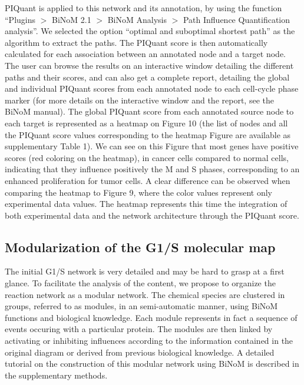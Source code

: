 \documentclass[10pt]{bmc_article}
\newenvironment{bmcformat}{\baselineskip20pt\sloppy\setboolean{publ}{false}}{\baselineskip20pt\sloppy}
\begin{document}
\begin{bmcformat}
PIQuant is applied to this network and its annotation, by using the function
``Plugins $>$ BiNoM 2.1 $>$ BiNoM Analysis $>$ Path Influence Quantification
analysis''. We selected the option ``optimal and
suboptimal shortest path'' as the algorithm to extract the paths. The PIQuant
score is then automatically calculated for each association
between an annotated node and a target node. The user can browse the results on an
interactive window detailing the different paths and their scores, and can also
get a complete report, detailing the global and individual PIQuant scores from
each annotated node to each cell-cycle phase marker (for more details on
the interactive window and the report, see the BiNoM manual).
The global PIQuant score from each annotated source node to each target is
represented as a heatmap on Figure 10 (the list of nodes and all the PIQuant
score values corresponding to the heatmap Figure are available as supplementary
Table 1). We can see on this Figure that most
genes have positive scores (red coloring on the heatmap), in cancer cells compared to normal cells, indicating that they influence positively the M and
S phases, corresponding to an enhanced proliferation for tumor cells.
A clear difference can be observed when comparing the heatmap to Figure 9, where
the color values represent only experimental data values. The heatmap represents
this time the integration of both experimental data and the network
architecture through the PIQuant score.



\subsection*{Modularization of the G1/S molecular map}

The initial G1/S network is very detailed and may be hard to grasp at a first glance.
To facilitate the analysis of the content, we propose to organize the reaction
network as a modular network. The chemical species are clustered in groups, referred to
as modules, in an semi-automatic manner, using BiNoM functions and biological
knowledge. Each module represents in fact a
sequence of events occuring with a particular protein. The modules are then
linked by activating or inhibiting influences according to the information
contained in the original diagram or derived from previous biological knowledge.
A detailed tutorial on the construction of this modular network using BiNoM is
described in the supplementary methods.


\end{bmcformat}
\end{document}
